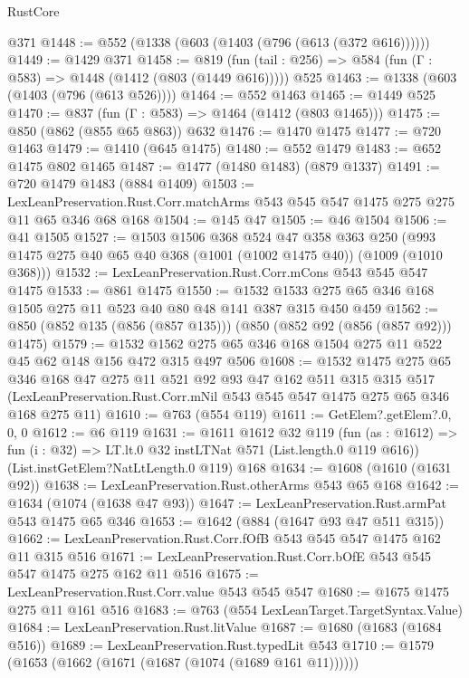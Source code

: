 \begin{lexlean}{RustCore}
\begin{coremodule}
    @371
@1448 := @552 (@1338 (@603 (@1403 (@796 (@613 (@372 @616))))))
@1449 := @1429 @371
@1458 := @819 (fun (tail : @256) => @584 (fun (Γ : @583) => @1448 (@1412 (@803 (@1449 @616))))) @525
@1463 := @1338 (@603 (@1403 (@796 (@613 @526))))
@1464 := @552 @1463
@1465 := @1449 @525
@1470 := @837 (fun (Γ : @583) => @1464 (@1412 (@803 @1465)))
@1475 := @850 (@862 (@855 @65 @863)) @632
@1476 := @1470 @1475
@1477 := @720 @1463
@1479 := @1410 (@645 @1475)
@1480 := @552 @1479
@1483 := @652 @1475 @802 @1465
@1487 := @1477 (@1480 @1483) (@879 @1337)
@1491 := @720 @1479 @1483 (@884 @1409)
@1503 := LexLeanPreservation.Rust.Corr.matchArms
    @543
    @545
    @547
    @1475
    @275
    @275
    @11
    @65
    @346
    @68
    @168
@1504 := @145 @47
@1505 := @46 @1504
@1506 := @41 @1505
@1527 := @1503
    @1506
    @368
    @524
    @47
    @358
    @363
    @250
    (@993 @1475 @275 @40 @65 @40 @368 (@1001 (@1002 @1475 @40)) (@1009 (@1010 @368)))
@1532 := LexLeanPreservation.Rust.Corr.mCons @543 @545 @547 @1475
@1533 := @861 @1475
@1550 := @1532 @1533 @275 @65 @346 @168 @1505 @275 @11 @523 @40 @80 @48 @141 @387 @315 @450 @459
@1562 := @850 (@852 @135 (@856 (@857 @135))) (@850 (@852 @92 (@856 (@857 @92))) @1475)
@1579 := @1532 @1562 @275 @65 @346 @168 @1504 @275 @11 @522 @45 @62 @148 @156 @472 @315 @497 @506
@1608 := @1532
    @1475
    @275
    @65
    @346
    @168
    @47
    @275
    @11
    @521
    @92
    @93
    @47
    @162
    @511
    @315
    @315
    @517
    (LexLeanPreservation.Rust.Corr.mNil @543 @545 @547 @1475 @275 @65 @346 @168 @275 @11)
@1610 := @763 (@554 @119)
@1611 := GetElem?.getElem?.{0, 0, 0}
@1612 := @6 @119
@1631 := @1611
    @1612
    @32
    @119
    (fun (as : @1612) => fun (i : @32) => LT.lt.{0} @32 instLTNat @571 (List.length.{0} @119 @616))
    (List.instGetElem?NatLtLength.{0} @119)
    @168
@1634 := @1608 (@1610 (@1631 @92))
@1638 := LexLeanPreservation.Rust.otherArms @543 @65 @168
@1642 := @1634 (@1074 (@1638 @47 @93))
@1647 := LexLeanPreservation.Rust.armPat @543 @1475 @65 @346
@1653 := @1642 (@884 (@1647 @93 @47 @511 @315))
@1662 := LexLeanPreservation.Rust.Corr.fOfB @543 @545 @547 @1475 @162 @11 @315 @516
@1671 := LexLeanPreservation.Rust.Corr.bOfE @543 @545 @547 @1475 @275 @162 @11 @516
@1675 := LexLeanPreservation.Rust.Corr.value @543 @545 @547
@1680 := @1675 @1475 @275 @11 @161 @516
@1683 := @763 (@554 LexLeanTarget.TargetSyntax.Value)
@1684 := LexLeanPreservation.Rust.litValue
@1687 := @1680 (@1683 (@1684 @516))
@1689 := LexLeanPreservation.Rust.typedLit @543
@1710 := @1579
    (@1653 (@1662 (@1671 (@1687 (@1074 (@1689 @161 @11))))))

\end{coremodule}
\end{lexlean}

